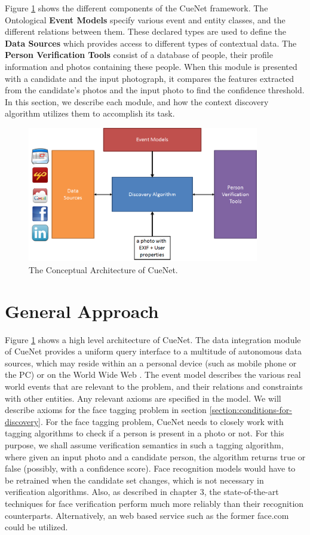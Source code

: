 Figure \ref{fig:cuenet-arch} shows the different components of the CueNet framework. The Ontological \textbf{Event Models} specify various event and entity classes, and the different relations between them. These declared types are used to define the \textbf{Data Sources} which provides access to different types of contextual data. The \textbf{Person Verification Tools} consist of a database of people, their profile information and photos containing these people. When this module is presented with a candidate and the input photograph, it compares the features extracted from the candidate's photos and the input photo to find the confidence threshold. In this section, we describe each module, and how the context discovery algorithm utilizes them to accomplish its task.

\begin{figure}[t]
\centering
\includegraphics[width=0.9\textwidth]{media/cuenet-high-level-arch.png}
\caption{The Conceptual Architecture of CueNet.}
\label{fig:cuenet-arch}
\end{figure}

\section{General Approach}
Figure \ref{fig:cuenet-arch} shows a high level architecture of CueNet. The data integration module of CueNet provides a uniform query interface to a multitude of autonomous data sources, which may reside within an a personal device (such as mobile phone or the PC) or on the World Wide Web \cite{halevy2001answering}. The event model describes the various real world events that are relevant to the problem, and their relations and constraints with other entities. Any relevant axioms are specified in the model. We will describe axioms for the face tagging problem in section \ref{section:conditions-for-discovery}. For the face tagging problem, CueNet needs to closely work with tagging algorithms to check if a person is present in a photo or not. For this purpose, we shall assume verification semantics in such a tagging algorithm, where given an input photo and a candidate person, the algorithm returns true or false (possibly, with a confidence score). Face recognition models would have to be retrained when the candidate set changes, which is not necessary in verification algorithms. Also, as described in chapter 3, the state-of-the-art techniques for face verification perform much more reliably than their recognition counterparts. Alternatively, an web based service such as the former face.com could be utilized. 

